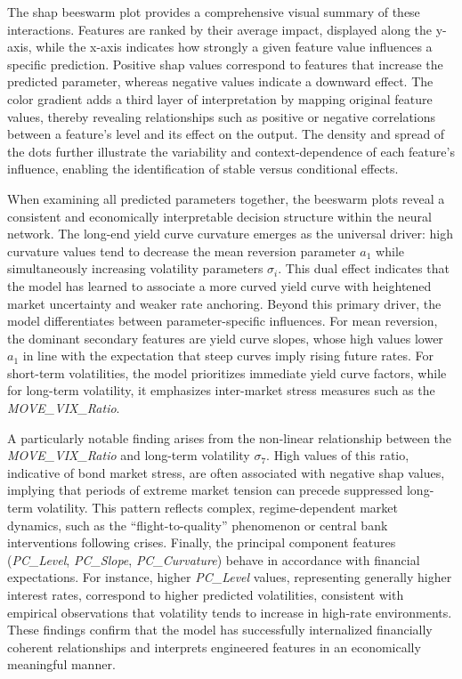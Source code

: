 The \ac{shap} beeswarm plot provides a comprehensive visual summary of these interactions. Features are ranked by their average impact, displayed along the y-axis, while the x-axis indicates how strongly a given feature value influences a specific prediction. Positive \ac{shap} values correspond to features that increase the predicted parameter, whereas negative values indicate a downward effect. The color gradient adds a third layer of interpretation by mapping original feature values, thereby revealing relationships such as positive or negative correlations between a feature's level and its effect on the output. The density and spread of the dots further illustrate the variability and context-dependence of each feature's influence, enabling the identification of stable versus conditional effects.

When examining all predicted parameters together, the beeswarm plots reveal a consistent and economically interpretable decision structure within the neural network. The long-end yield curve curvature emerges as the universal driver: high curvature values tend to decrease the mean reversion parameter \(a_1\) while simultaneously increasing volatility parameters \(\sigma_i\). This dual effect indicates that the model has learned to associate a more curved yield curve with heightened market uncertainty and weaker rate anchoring. Beyond this primary driver, the model differentiates between parameter-specific influences. For mean reversion, the dominant secondary features are yield curve slopes, whose high values lower \(a_1\) in line with the expectation that steep curves imply rising future rates. For short-term volatilities, the model prioritizes immediate yield curve factors, while for long-term volatility, it emphasizes inter-market stress measures such as the \textit{MOVE\_VIX\_Ratio}.

A particularly notable finding arises from the non-linear relationship between the \linebreak \textit{MOVE\_VIX\_Ratio} and long-term volatility \(\sigma_7\). High values of this ratio, indicative of bond market stress, are often associated with negative \ac{shap} values, implying that periods of extreme market tension can precede suppressed long-term volatility. This pattern reflects complex, regime-dependent market dynamics, such as the “flight-to-quality” phenomenon or central bank interventions following crises. Finally, the principal component features (\textit{PC\_Level}, \textit{PC\_Slope}, \textit{PC\_Curvature}) behave in accordance with financial expectations. For instance, higher \textit{PC\_Level} values, representing generally higher interest rates, correspond to higher predicted volatilities, consistent with empirical observations that volatility tends to increase in high-rate environments. These findings confirm that the model has successfully internalized financially coherent relationships and interprets engineered features in an economically meaningful manner.

